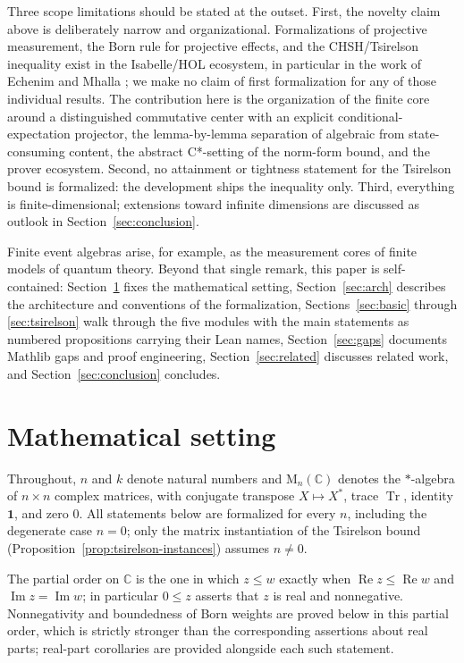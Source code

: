 \documentclass[11pt]{article}
\renewcommand{\_}{\textunderscore\allowbreak}
\theoremstyle{remark}
\newcommand{\C}{\mathbb C}
\newcommand{\Mn}{\mathrm{M}_n(\C)}
\newcommand{\Tr}{\operatorname{Tr}}
\newcommand{\one}{\mathbf 1}
\begin{document}
Three scope limitations should be stated at the outset. First, the novelty claim above is deliberately narrow and organizational. Formalizations of projective measurement, the Born rule for projective effects, and the CHSH/Tsirelson inequality exist in the Isabelle/HOL ecosystem, in particular in the work of Echenim and Mhalla \cite{echenim2021afp,echenimmhalla2023afp,echenimmhalla2024}; we make no claim of first formalization for any of those individual results. The contribution here is the organization of the finite core around a distinguished commutative center with an explicit conditional-expectation projector, the lemma-by-lemma separation of algebraic from state-consuming content, the abstract C*-setting of the norm-form bound, and the prover ecosystem. Second, no attainment or tightness statement for the Tsirelson bound is formalized: the development ships the inequality only. Third, everything is finite-dimensional; extensions toward infinite dimensions are discussed as outlook in Section~\ref{sec:conclusion}.

Finite event algebras arise, for example, as the measurement cores of finite models of quantum theory. Beyond that single remark, this paper is self-contained: Section~\ref{sec:setting} fixes the mathematical setting, Section~\ref{sec:arch} describes the architecture and conventions of the formalization, Sections~\ref{sec:basic} through \ref{sec:tsirelson} walk through the five modules with the main statements as numbered propositions carrying their Lean names, Section~\ref{sec:gaps} documents Mathlib gaps and proof engineering, Section~\ref{sec:related} discusses related work, and Section~\ref{sec:conclusion} concludes.

\section{Mathematical setting}
\label{sec:setting}

Throughout, $n$ and $k$ denote natural numbers and $\Mn$ denotes the $*$-algebra of $n \times n$ complex matrices, with conjugate transpose $X \mapsto X^{*}$, trace $\Tr$, identity $\one$, and zero $0$. All statements below are formalized for every $n$, including the degenerate case $n = 0$; only the matrix instantiation of the Tsirelson bound (Proposition~\ref{prop:tsirelson-instances}) assumes $n \neq 0$.

The partial order on $\C$ is the one in which $z \le w$ exactly when $\operatorname{Re} z \le \operatorname{Re} w$ and $\operatorname{Im} z = \operatorname{Im} w$; in particular $0 \le z$ asserts that $z$ is real and nonnegative. Nonnegativity and boundedness of Born weights are proved below in this partial order, which is strictly stronger than the corresponding assertions about real parts; real-part corollaries are provided alongside each such statement.
\end{document}
